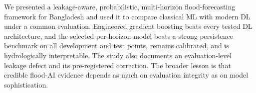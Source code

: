 \documentclass[conference]{IEEEtran}
\begin{document}
We presented a leakage-aware, probabilistic, multi-horizon flood-forecasting framework for Bangladesh and used it to compare classical ML with modern DL under a common evaluation. Engineered gradient boosting beats every tested DL architecture, and the selected per-horizon model beats a strong persistence benchmark on all development and test points, remains calibrated, and is hydrologically interpretable. The study also documents an evaluation-level leakage defect and its pre-registered correction. The broader lesson is that credible flood-AI evidence depends as much on evaluation integrity as on model sophistication.



\end{document}
